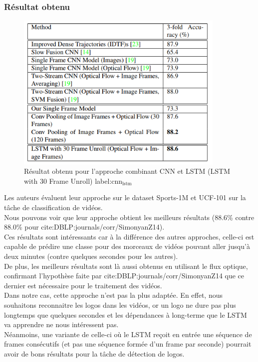 \documentclass[11pt]{article}
\begin{document}
\subsubsection{Résultat obtenu}
\label{sec:org8898779}
\begin{figure}[htbp]
\centering
\includegraphics[width=10cm]{cnn_lstm_res.png}
\caption{Résultat obtenu pour l'approche combinant CNN et LSTM (LSTM with 30 Frame Unroll) label:cnn\(_{\text{lstm}}\)}
\end{figure}
Les auteurs évaluent leur approche sur le dataset Sports-1M et UCF-101 sur la tâche de classification de vidéos.\\
Nous pouvons voir que leur approche obtient les meilleurs résultats (88.6\% contre 88.0\% pour cite:DBLP:journals/corr/SimonyanZ14).\\
Ces résultats sont intéressants car à la différence des autres approches, celle-ci est capable de prédire une classe pour des morceaux de vidéos pouvant aller jusqu'à deux minutes (contre quelques secondes pour les autres).\\
De plus, les meilleurs résultats sont là aussi obtenus en utilisant le flux optique, confirmant l'hypothèse faite par cite:DBLP:journals/corr/SimonyanZ14 que ce dernier est nécessaire pour le traitement des vidéos.\\

Dans notre cas, cette approche n'est pas la plus adaptée. En effet, nous souhaitons reconnaitre les logos dans les vidéos, or un logo ne dure pas plus longtemps que quelques secondes et les dépendances à long-terme que le LSTM va apprendre ne nous intéressent pas.\\
Néanmoins, une variante de celle-ci où le LSTM reçoit en entrée une séquence de frames consécutifs (et pas une séquence formée d'un frame par seconde) pourrait avoir de bons résultats pour la tâche de détection de logos.\\
\end{document}
